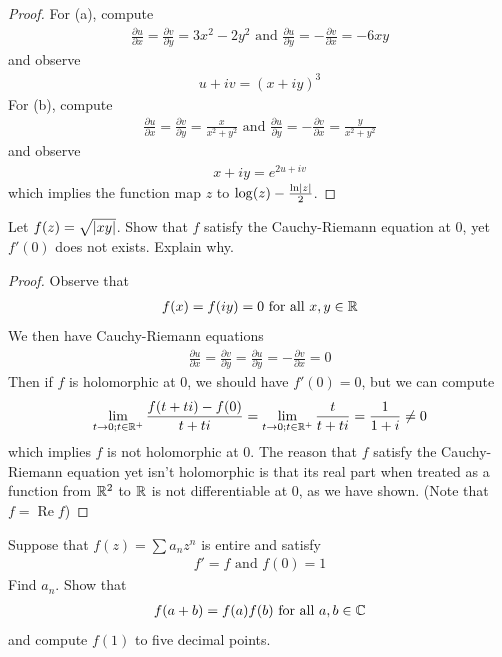 \documentclass{report}
\begin{document}
\begin{proof}
For (a), compute 
\begin{align*}
\frac{\partial u}{\partial x}=\frac{\partial v}{\partial y}=3x^2-2y^2\text{ and }\frac{\partial u}{\partial y}= -\frac{\partial v}{\partial x}=-6xy
\end{align*}
and observe 
\begin{align*}
u+iv=(x+iy)^3
\end{align*}
For (b), compute 
\begin{align*}
\frac{\partial u}{\partial x}= \frac{\partial v}{\partial y} = \frac{x}{x^2+y^2}\text{ and } \frac{\partial u}{\partial y}=-\frac{\partial v}{\partial x}= \frac{y}{x^2+y^2}
\end{align*}
and observe 
\begin{align*}
x+iy=e^{2u+iv}
\end{align*}
which implies the function map $z$ to  $\log (z)- \frac{\ln \left|z\right|}{2}$. 
\end{proof}
\begin{question}{}{}
Let $f(z)=\sqrt{\left|xy\right|}$. Show that  $f$ satisfy the Cauchy-Riemann equation at $0$, yet  $f'(0)$ does not exists. Explain why. 
\end{question}
\begin{proof}
Observe that 
\begin{align*}
f(x)=f(iy)=0\text{ for all }x,y\in\mathbb{R}
\end{align*}
We then have Cauchy-Riemann equations  
\begin{align*}
\frac{\partial u}{\partial x}=\frac{\partial v}{\partial  y}= \frac{\partial u}{\partial y}= - \frac{\partial v}{\partial x}=0
\end{align*}
Then if $f$ is holomorphic at $0$, we should have  $f'(0)=0$, but we can compute 
\begin{align*}
\lim_{t\to 0;t\in\mathbb{R}^+} \frac{f(t+ti)-f(0)}{t+ti}=\lim_{t\to 0;t\in\mathbb{R}^+} \frac{t}{t+ti}=  \frac{1}{1+i}\neq 0
\end{align*}
which implies $f$ is not holomorphic at $0$. The reason that $f$ satisfy the Cauchy-Riemann equation yet isn't holomorphic is that its real part when treated as a function from $\mathbb{R}^2$ to $\mathbb{R}$ is not differentiable at $0$, as we have shown. (Note that $f=\operatorname{Re}f$) 
\end{proof}
\begin{question}{}{}
Suppose that $f(z)=\sum a_nz^n$ is entire and satisfy 
\begin{align*}
f'=f\text{ and }f(0)=1
\end{align*}
Find $a_n$. Show that 
\begin{align*}
f(a+b)=f(a)f(b)\text{ for all }a,b \in\mathbb{C}
\end{align*}
and compute $f(1)$ to five decimal points. 
\end{question}
\end{document}
